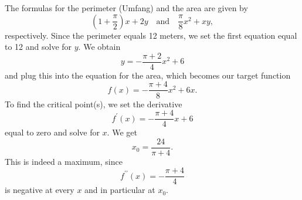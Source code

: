 \begin{solution*}
	The formulas for the perimeter (Umfang) and the area are given by
	\begin{equation*}
		\left(1+\frac{\pi}{2}\right)x+2y
		\quad\text{and}\quad
		\frac{\pi}{8}x^2+xy,
	\end{equation*}
	respectively.
	Since the perimeter equals 12 meters, we set the first equation equal to 12 and solve for $y$.
	We obtain
	\begin{equation*}
		y=-\frac{\pi+2}{4}x^2+6
	\end{equation*}
	and plug this into the equation for the area, which becomes our target function
	\begin{equation*}
		f\left(x\right)=-\frac{\pi+4}{8}x^2+6x.
	\end{equation*}
	To find the critical point(s), we set the derivative
	\begin{equation*}
		f^{\prime}\left(x\right)=-\frac{\pi+4}{4}x+6
	\end{equation*}
	equal to zero and solve for $x$.
	We get
	\begin{equation*}
		x_0=\frac{24}{\pi+4}.
	\end{equation*}
	This is indeed a maximum, since
	\begin{equation*}
		f^{\prime\prime}\left(x\right)=-\frac{\pi+4}{4}
	\end{equation*}
	is negative at every $x$ and in particular at $x_0$.
\end{solution*}